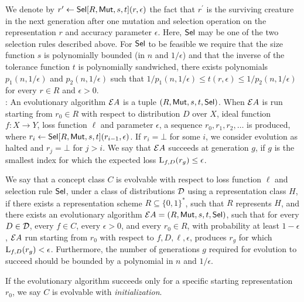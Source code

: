 We denote by $r^\prime \leftarrow \mathsf{Sel}[R, \mathsf{Mut}, s, t](r, \epsilon)$ the fact
that $r^\prime$ is the surviving creature in the next generation after one
mutation and selection operation on the representation $r$ and accuracy
parameter $\epsilon$. Here, $\mathsf{Sel}$ may be one of the two selection rules
described above. For $\mathsf{Sel}$ to be feasible we require that the size function $s$
is polynomially bounded (in $n$ and $1/\epsilon$) and that the inverse of the tolerance
function $t$ is polynomially sandwiched, \ie there exists polynomials $p_1(n,
1/\epsilon)$ and $p_2(n, 1/\epsilon)$ such that $1/p_1(n, 1/\epsilon) \leq t(r,
\epsilon) \leq 1/p_2(n, 1/\epsilon)$ for every $r \in R$ and $\epsilon > 0$.
\medskip \\
%
: An evolutionary algorithm ${\mathcal EA}$ is a
tuple $(R, \mathsf{Mut}, s, t, \mathsf{Sel})$. When ${\mathcal EA}$ is run starting from $r_0 \in R$
with respect to distribution $D$ over $X$, ideal function $f : X \rightarrow Y$,
loss function $\ell$ and parameter $\epsilon$, a sequence $r_0, r_1, r_2,
\ldots$ is produced, where $r_i \leftarrow \mathsf{Sel}[R, \mathsf{Mut}, s, t](r_{i - 1},
\epsilon)$. If $r_i = \bot$ for some $i$, we consider evolution as halted and
$r_j = \bot$ for $j > i$. We say that ${\mathcal EA}$ succeeds at generation $g$, if
$g$ is the smallest index for which the expected loss $\mathrm{L}_{f, D}(r_g) \leq
\epsilon$.

\begin{definition} We say that a
concept class $C$ is evolvable with respect to loss function $\ell$ and selection
rule $\mathsf{Sel}$, under a class of distributions ${\mathcal D}$ using a representation
class $H$, if there exists a representation scheme $R \subseteq \{0, 1\}^*$,
such that $R$ represents $H$, and there exists an evolutionary algorithm ${\mathcal EA}
= (R, \mathsf{Mut}, s, t, \mathsf{Sel})$, such that for every $D \in {\mathcal D}$, every $f \in C$,
every $\epsilon > 0$, and every $r_0 \in R$, with probability at least $1 -
\epsilon$, ${\mathcal EA}$ run starting from $r_0$ with respect to $f, D, \ell,
\epsilon$, produces $r_g$ for which $\mathrm{L}_{f, D}(r_g) < \epsilon$.
Furthermore, the number of generations $g$ required for evolution to succeed
should be bounded by a polynomial in $n$ and $1/\epsilon$.  \end{definition}

\begin{remark} If the evolutionary algorithm succeeds only for a specific
starting representation $r_0$, we say $C$ is evolvable with
\emph{initialization}. \end{remark}

